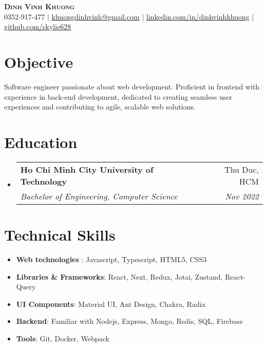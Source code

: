 \documentclass[letterpaper,11pt]{article}
\makeatletter
\newcommand{\resumeItem}[1]{
  \item\small{
    {#1 \vspace{-2pt}}
  }
}
\newcommand{\resumeSubheading}[4]{
  \vspace{-2pt}\item
    \begin{tabular*}{0.97\textwidth}[t]{l@{\extracolsep{\fill}}r}
      \textbf{#1} & #2 \\
      \textit{\small#3} & \textit{\small #4} \\
    \end{tabular*}\vspace{-7pt}
}
\newcommand{\resumeSubHeadingListStart}{\begin{itemize}[leftmargin=0.15in, label={}]}
\newcommand{\resumeSubHeadingListEnd}{\end{itemize}}
\newcommand{\resumeItemListStart}{\begin{itemize}}
\newcommand{\resumeItemListEnd}{\end{itemize}\vspace{-5pt}}
\makeatother
\begin{document}

\begin{center}
    \textbf{\Huge \scshape Dinh Vinh Khuong} \\ \vspace{1pt}
    \small 0352-917-477 $|$ \underline{\href{mailto:khuongdinhvinh@gmail.com}{khuongdinhvinh@gmail.com}}
    $|$ 
    \underline{\href{https://linkedin.com/in/dinhvinhkhuong}{linkedin.com/in/dinhvinhkhuong}}
   $|$
    \underline{\href{https://github.com/skylie628}{github.com/skylie628}}
\end{center}

\section{\textbf{Objective}}
  Software engineer passionate about web development. Proficient in frontend with experience in back-end development, dedicated to creating seamless user experiences and contributing to agile, scalable web solutions. 


\section{\textbf{Education}}
  \resumeSubHeadingListStart
    \resumeSubheading
      {Ho Chi Minh City University of Technology}{Thu Duc, HCM}
      {Bachelor of Engineering, Computer Science}{Nov 2022}
  \resumeSubHeadingListEnd


\section{\textbf{Technical Skills}}
 \begin{itemize}[leftmargin=0.15in, label={}]
  \resumeItemListStart
     \resumeItem{\textbf{Web technologies} : Javascript, Typescript, HTML5, CSS3}
     \resumeItem{ \textbf{Libraries & Frameworks}: React, Next, Redux, Jotai, Zustand, React-Query} 
    \resumeItem{   \textbf{UI Components}: Material UI, Ant Design, Chakra, Radix }
      \resumeItem{\textbf{Backend}: Familiar with Nodejs, Express, Mongo, Redis, SQL, Firebase}
      \resumeItem{\textbf{Tools}: Git, Docker, Webpack}
     \resumeItemListEnd
 \end{itemize}
\end{document}
